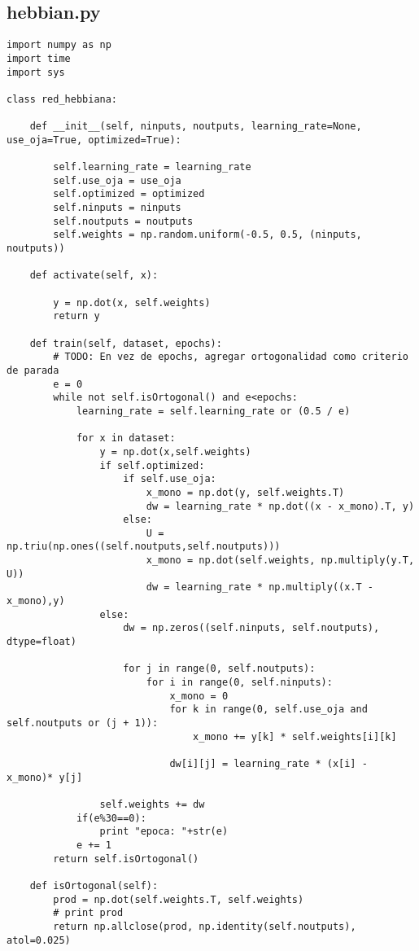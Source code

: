 \subsection{hebbian.py}
\begin{lstlisting}[caption=main.py]
import numpy as np
import time
import sys

class red_hebbiana:

    def __init__(self, ninputs, noutputs, learning_rate=None, use_oja=True, optimized=True):

        self.learning_rate = learning_rate
        self.use_oja = use_oja
        self.optimized = optimized
        self.ninputs = ninputs
        self.noutputs = noutputs
        self.weights = np.random.uniform(-0.5, 0.5, (ninputs, noutputs))

    def activate(self, x):

        y = np.dot(x, self.weights)
        return y

    def train(self, dataset, epochs):
        # TODO: En vez de epochs, agregar ortogonalidad como criterio de parada
        e = 0
        while not self.isOrtogonal() and e<epochs:
            learning_rate = self.learning_rate or (0.5 / e)

            for x in dataset:
                y = np.dot(x,self.weights)
                if self.optimized:
                    if self.use_oja:
                        x_mono = np.dot(y, self.weights.T)
                        dw = learning_rate * np.dot((x - x_mono).T, y)
                    else:
                        U = np.triu(np.ones((self.noutputs,self.noutputs)))
                        x_mono = np.dot(self.weights, np.multiply(y.T, U))
                        dw = learning_rate * np.multiply((x.T - x_mono),y)
                else:
                    dw = np.zeros((self.ninputs, self.noutputs), dtype=float)

                    for j in range(0, self.noutputs):
                        for i in range(0, self.ninputs):
                            x_mono = 0
                            for k in range(0, self.use_oja and self.noutputs or (j + 1)):
                                x_mono += y[k] * self.weights[i][k]

                            dw[i][j] = learning_rate * (x[i] - x_mono)* y[j] 

                self.weights += dw
            if(e%30==0): 
                print "epoca: "+str(e)
            e += 1
        return self.isOrtogonal()

    def isOrtogonal(self):
        prod = np.dot(self.weights.T, self.weights)
        # print prod
        return np.allclose(prod, np.identity(self.noutputs), atol=0.025)



\end{lstlisting}


